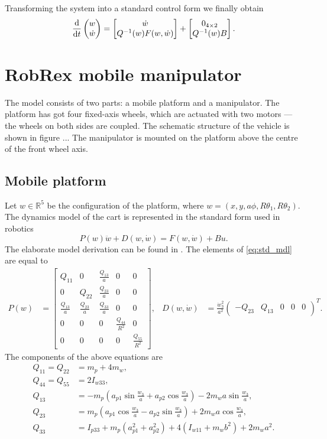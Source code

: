 Transforming the system into a standard control form we finally obtain
\begin{equation}
\frac{\mathrm{d}}{\mathrm{d} t}\begin{pmatrix}
w \\ \dot w
\end{pmatrix}
 = 
 \begin{bmatrix}
 \dot w \\ Q^{-1}(w)F(w, \dot w)
 \end{bmatrix}+\begin{bmatrix}
 0_{4\times 2} \\ Q^{-1}(w)B
 \end{bmatrix}.
\end{equation}
\section{RobRex mobile manipulator}
The model consists of two parts: a mobile platform and a manipulator. The platform has got four fixed-axis wheels, which are actuated with two motors --- the wheels on both sides are coupled. The schematic structure of the vehicle is shown in figure ... %
The manipulator is mounted on the platform above the centre of the front wheel axis.
\subsection{Mobile platform}
Let $w\in \mathbb{R}^5$ be the configuration of the platform, where
$w=(x, y, a\phi, R\theta_1, R\theta_2)$.  
The dynamics model of the cart is represented in the standard form used in robotics
\begin{equation}
\label{eq:std_mdl}
P(w)\ddot w + D(w, \dot w) = F(w, \dot w) + Bu.
\end{equation}
The elaborate model derivation can be found in \cite{coupled}. 
The elements of \eqref{eq:std_mdl} are equal to
\begin{align}
P(w) &= \begin{bmatrix}
Q_{11} & 0 & \frac{Q_{13}}{a} & 0 & 0\\
0 & Q_{22} & \frac{Q_{23}}{a} & 0 & 0\\
\frac{Q_{13}}{a} & \frac{Q_{23}}{a} & \frac{Q_{33}}{a} & 0 & 0\\
0 & 0 & 0 & \frac{Q_{44}}{R^2} & 0 \\
0 & 0 & 0 & 0 & \frac{Q_{55}}{R^2}
\end{bmatrix}, & 
D(w, \dot w) &= \frac{\dot w_3^2}{a^2}\begin{pmatrix}
-Q_{23} & Q_{13} & 0 & 0 & 0
\end{pmatrix}^T.
\end{align}
The components of the above equations are
\begin{align}
Q_{11} = Q_{22} &= m_p+4m_w,\\
Q_{44} = Q_{55} &= 2I_{w33},\\
Q_{13} &= -m_p(a_{p1}\sin\frac{w_3}{a}+a_{p2}\cos\frac{w_3}{a})- 2m_wa\sin\frac{w_3}{a},\\
Q_{23} &=  m_p(a_{p1}\cos\frac{w_3}{a}-a_{p2}\sin\frac{w_3}{a})+ 2m_wa\cos\frac{w_3}{a},\\
Q_{33} &= I_{p33}+m_p(a_{p1}^2+a_{p2}^2)+4(I_{w11}+m_wb^2)+2m_wa^2.
\end{align}

